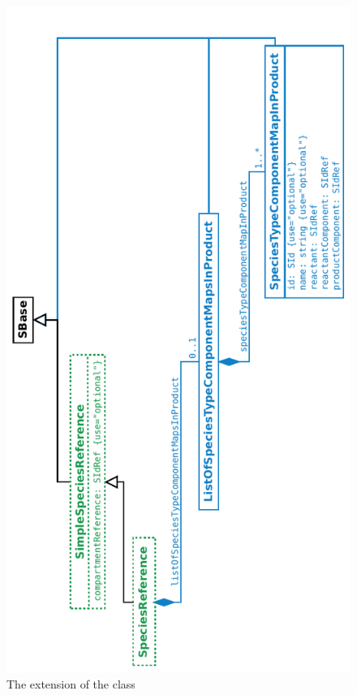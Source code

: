 \begin{figure}[htb]
  \begin{center}
    \includegraphics[angle=-90, scale=0.75]{./figs/multi_011_SpeciesReference.pdf}
    \caption{The extension of the \ExSpeciesReference class}
  \label{fig:ExSpeciesReference}
  \end{center}
\end{figure}

